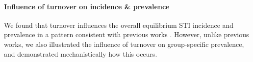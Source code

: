 \paragraph{Influence of turnover on incidence \& prevalence}
We found that turnover influences the overall equilibrium STI incidence and prevalence
in a pattern consistent with previous works \citep{Stigum1994,Zhang2012,Henry2015}.
However, unlike previous works, we also illustrated the influence of turnover on
group-specific prevalence, and demonstrated mechanistically how this occurs.
